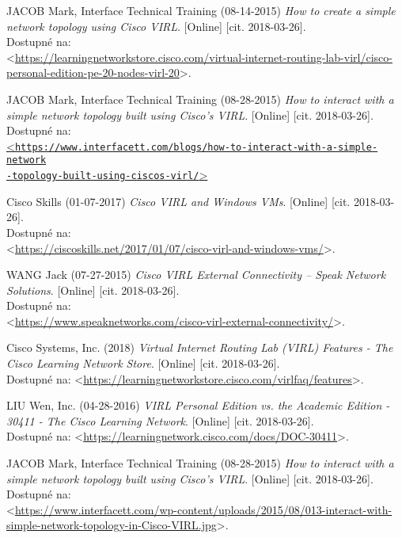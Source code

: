 \begin{thebibliography}{99}
JACOB Mark, Interface Technical Training (08-14-2015) {\it How to create a simple network topology using Cisco VIRL}. [Online] [cit. 2018-03-26]. \\
Dostupné na: \\<\url{https://learningnetworkstore.cisco.com/virtual-internet-routing-lab-virl/cisco-personal-edition-pe-20-nodes-virl-20}>.

JACOB Mark, Interface Technical Training (08-28-2015) {\it How to interact with a simple network topology built using Cisco’s VIRL}. [Online] [cit. 2018-03-26]. \\
Dostupné na: \\
\href{https://www.interfacett.com/blogs/how-to-interact-with-a-simple-network-topology-built-using-ciscos-virl/}{<\texttt{https://www.interfacett.com/blogs/how-to-interact-with-a-simple-network\\-topology-built-using-ciscos-virl/}>}

Cisco Skills (01-07-2017) {\it Cisco VIRL and Windows VMs}. [Online] [cit. 2018-03-26]. \\
Dostupné na: \\<\url{https://ciscoskills.net/2017/01/07/cisco-virl-and-windows-vms/}>.

WANG Jack (07-27-2015) {\it Cisco VIRL External Connectivity – Speak Network Solutions}. [Online] [cit. 2018-03-26]. \\
Dostupné na: \\<\url{https://www.speaknetworks.com/cisco-virl-external-connectivity/}>.

Cisco Systems, Inc. (2018) {\it Virtual Internet Routing Lab (VIRL) Features - The Cisco Learning Network Store}. [Online] [cit. 2018-03-26]. \\
Dostupné na: <\url{https://learningnetworkstore.cisco.com/virlfaq/features}>.

LIU Wen, Inc. (04-28-2016) {\it VIRL Personal Edition vs. the Academic Edition - 30411 - The Cisco Learning Network}. [Online] [cit. 2018-03-26]. \\
Dostupné na: <\url{https://learningnetwork.cisco.com/docs/DOC-30411}>.

JACOB Mark, Interface Technical Training (08-28-2015) {\it How to interact with a simple network topology built using Cisco’s VIRL}. [Online] [cit. 2018-03-26]. \\
Dostupné na: \\
<\url{https://www.interfacett.com/wp-content/uploads/2015/08/013-interact-with-simple-network-topology-in-Cisco-VIRL.jpg}>.


\end{thebibliography}
